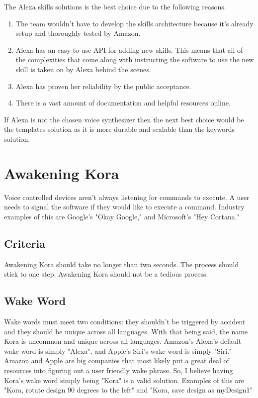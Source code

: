 \documentclass[onecolumn, draftclsnofoot,10pt, compsoc]{IEEEtran}
\begin{document}
			The Alexa skills solutions is the best choice due to the following reasons.
			\begin{enumerate}
				\item{
					The team wouldn't have to develop the skills architecture because it's already setup and thoroughly tested by Amazon.}
				\item{
					Alexa has an easy to use API for adding new skills.
					This means that all of the complexities that come along with instructing the software to use the new skill is taken on by Alexa behind the scenes.}
				\item{
					Alexa has proven her reliability by the public acceptance.}
				\item{
					There is a vast amount of documentation and helpful resources online.}
			\end{enumerate}
			
			If Alexa is not the chosen voice synthesizer then the next best choice would be the templates solution as it is more durable and scalable than the keywords solution.

	
	\section{Awakening Kora}
		Voice controlled devices aren't always listening for commands to execute.
		A user needs to signal the software if they would like to execute a command.
		Industry examples of this are Google's "Okay Google," and Microsoft's "Hey Cortana."
		
		\subsection{Criteria}
			Awakening Kora should take no longer than two seconds.
			The process should stick to one step.
			Awakening Kora should not be a tedious process.
		
		\subsection{Wake Word}
			Wake words must meet two conditions: they shouldn't be triggered by accident and they should be unique across all languages.
			With that being said, the name Kora is uncommon and unique across all languages.
			Amazon's Alexa's default wake word is simply "Alexa", and Apple's Siri's wake word is simply "Siri."
			Amazon and Apple are big companies that most likely put a great deal of resources into figuring out a user friendly wake phrase.
			So, I believe having Kora's wake word simply being "Kora" is a valid solution.
			Examples of this are "Kora, rotate design 90 degrees to the left" and "Kora, save design as myDesign1"
		
\end{document}
